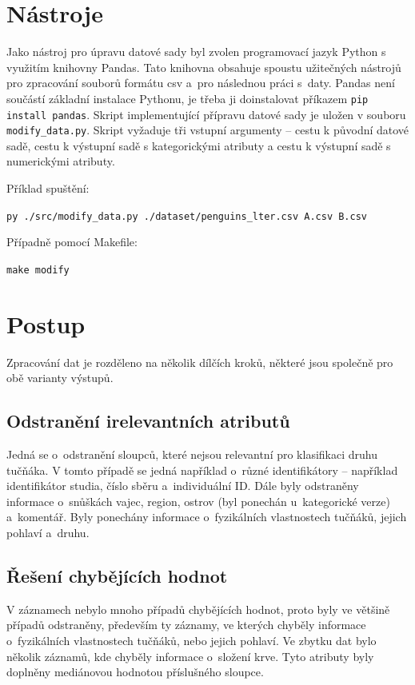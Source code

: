 \documentclass[10pt,xcolor=pdflatex,dvipsnames,table,oneside]{book}
\begin{document}
\section{Nástroje}
Jako nástroj pro úpravu datové sady byl zvolen programovací jazyk Python s využitím knihovny Pandas.
Tato knihovna obsahuje spoustu užitečných nástrojů pro zpracování souborů formátu csv a~pro následnou
práci s~daty. Pandas není součástí základní instalace Pythonu, je třeba ji doinstalovat
příkazem \verb|pip install pandas|. Skript implementující přípravu datové sady je uložen v
souboru \verb|modify_data.py|. Skript vyžaduje tři vstupní argumenty – cestu k původní datové sadě, cestu
k výstupní sadě s kategorickými atributy a cestu k výstupní sadě s numerickými atributy.\

Příklad spuštění:\

\verb|py ./src/modify_data.py ./dataset/penguins_lter.csv A.csv B.csv|\

Případně pomocí Makefile:\

\verb|make modify|\

\section{Postup}
Zpracování dat je rozděleno na několik dílčích kroků, některé jsou společně pro obě varianty výstupů.
\subsection{Odstranění irelevantních atributů}
Jedná se o~odstranění sloupců, které nejsou relevantní pro klasifikaci druhu tučňáka. V tomto případě se
jedná například o~různé identifikátory – například identifikátor studia, číslo sběru a~individuální ID.
Dále byly odstraněny informace o~snůškách vajec, region, ostrov (byl ponechán u~kategorické verze) a~komentář.
Byly ponechány informace o~fyzikálních vlastnostech tučňáků, jejich pohlaví a~druhu.

\subsection{Řešení chybějících hodnot}
V záznamech nebylo mnoho případů chybějících hodnot, proto byly ve většině případů odstraněny, především
ty záznamy, ve kterých chyběly informace o~fyzikálních vlastnostech tučňáků, nebo jejich pohlaví. Ve zbytku
dat bylo několik záznamů, kde chyběly informace o~složení krve. Tyto atributy byly doplněny mediánovou
hodnotou příslušného sloupce.
\end{document}
